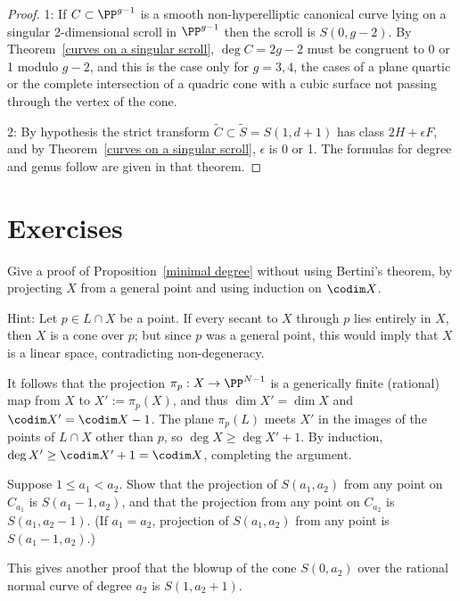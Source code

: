 \begin{proof} 1: If $C\subset \PP^{g-1}$ is a smooth non-hyperelliptic canonical curve lying on a singular 2-dimensional scroll in $\PP^{g-1}$
then the scroll is $S(0, g-2)$. By Theorem~\ref{curves on a singular scroll}, $\deg C = 2g-2$ must be congruent
to 0 or 1 modulo $g-2$, and this is the case only for $g=3,4$, the cases of a plane quartic or the complete intersection
of a quadric cone with a cubic surface not passing through the vertex of the cone.

2: By hypothesis the strict transform $\widetilde C\subset  \widetilde S = S(1, d+1)$
has class $2H+\epsilon F$,  and by Theorem~\ref{curves on a singular scroll}, $\epsilon$ is 0 or 1.
The formulas for degree and genus follow are given in that theorem.
\end{proof}

\section{Exercises}

\begin{exercise}
Give a proof of Proposition~\ref{minimal degree} without using
Bertini's theorem, by projecting $X$ from a general point and using
induction on $\codim X$. 
 
 Hint: Let $p\in L\cap X$ be a point. If every secant to $X$ through $p$ lies entirely in $X$, then $X$ is a cone over $p$; but since $p$ was a general point, this would imply that $X$ is a linear space, contradicting non-degeneracy. 

It follows that the projection $\pi_{p}:X \to \PP^{N-1}$ is a generically finite (rational) map from $X$ to $X' := \pi_{p}(X)$,
and thus $\dim X' = \dim X$ and $\codim X' = \codim X-1$. The plane 
$\pi_{p}(L)$ meets $X'$ in the images of the points of $L\cap X$ other than $p$, so
$\deg X\geq \deg X'+1$. By induction, $\deg X' \geq \codim X'+1 = \codim X$, completing the argument.
\end{exercise}

\begin{exercise}\label{special projections}
Suppose $1\leq a_1 < a_2$. Show that the projection of $S(a_1,a_2)$ from any point on $C_{a_1}$ is 
$S(a_1-1, a_2)$, and that the projection from any point on $C_{a_2}$ is $S(a_1, a_2-1)$. (If $a_1 = a_2$, projection of $S(a_1,a_2)$ from any point is $S(a_1-1, a_2)$.)

This gives another proof that the blowup of the cone $S(0,a_2)$ over the rational normal curve of degree $a_2$ is $S(1,a_2+1)$.  
\end{exercise}

